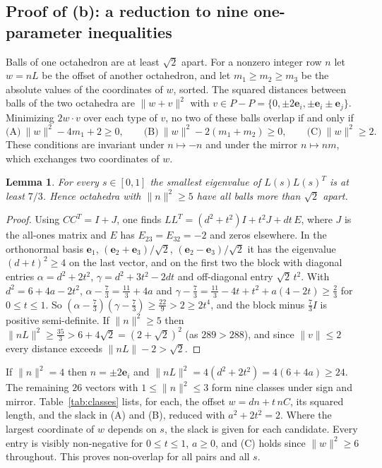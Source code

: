 \documentclass[11pt]{amsart}
\newtheorem{lemma}{Lemma}
\theoremstyle{definition}
\theoremstyle{remark}
\newcommand{\e}{\mathbf{e}}
\newcommand{\norm}[1]{\lVert#1\rVert}
\begin{document}
\subsection{Proof of (b): a reduction to nine one-parameter inequalities}
Balls of one octahedron are at least $\sqrt2$ apart. For a nonzero integer row $n$ let $w=nL$ be the offset of another octahedron, and let $m_1\ge m_2\ge m_3$ be the absolute values of the coordinates of $w$, sorted. The squared distances between balls of the two octahedra are $\norm{w+v}^2$ with $v\in P-P=\{0,\pm2\e_i,\pm\e_i\pm\e_j\}$. Minimizing $2w\cdot v$ over each type of $v$, no two of these balls overlap if and only if
\begin{equation}\label{eq:ABC}
\text{(A)}\ \norm w^2-4m_1+2\ge0,\qquad \text{(B)}\ \norm w^2-2(m_1+m_2)\ge0,\qquad \text{(C)}\ \norm w^2\ge2 .
\end{equation}
These conditions are invariant under $n\mapsto-n$ and under the mirror $n\mapsto nm$, which exchanges two coordinates of $w$.

\begin{lemma}\label{lem:far}
For every $s\in[0,1]$ the smallest eigenvalue of $L(s)L(s)^T$ is at least $7/3$. Hence octahedra with $\norm n^2\ge5$ have all balls more than $\sqrt2$ apart.
\end{lemma}

\begin{proof}
Using $CC^T=I+J$, one finds $LL^T=(d^2+t^2)I+t^2J+dt\,E$, where $J$ is the all-ones matrix and $E$ has $E_{23}=E_{32}=-2$ and zeros elsewhere. In the orthonormal basis $\e_1$, $(\e_2+\e_3)/\sqrt2$, $(\e_2-\e_3)/\sqrt2$ it has the eigenvalue $(d+t)^2\ge4$ on the last vector, and on the first two the block with diagonal entries $\alpha=d^2+2t^2$, $\gamma=d^2+3t^2-2dt$ and off-diagonal entry $\sqrt2\,t^2$. With $d^2=6+4a-2t^2$, $\alpha-\tfrac73=\tfrac{11}3+4a$ and $\gamma-\tfrac73=\tfrac{11}3-4t+t^2+a(4-2t)\ge\tfrac23$ for $0\le t\le1$. So $(\alpha-\tfrac73)(\gamma-\tfrac73)\ge\tfrac{22}9>2\ge2t^4$, and the block minus $\tfrac73 I$ is positive semi-definite. If $\norm n^2\ge5$ then $\norm{nL}^2\ge\tfrac{35}3>6+4\sqrt2=(2+\sqrt2)^2$ (as $289>288$), and since $\norm v\le2$ every distance exceeds $\norm{nL}-2>\sqrt2$.
\end{proof}

If $\norm n^2=4$ then $n=\pm2\e_i$ and $\norm{nL}^2=4(d^2+2t^2)=4(6+4a)\ge24$. The remaining $26$ vectors with $1\le\norm n^2\le3$ form nine classes under sign and mirror. Table~\ref{tab:classes} lists, for each, the offset $w=dn+t\,nC$, its squared length, and the slack in (A) and (B), reduced with $a^2+2t^2=2$. Where the largest coordinate of $w$ depends on $s$, the slack is given for each candidate. Every entry is visibly non-negative for $0\le t\le1$, $a\ge0$, and (C) holds since $\norm w^2\ge6$ throughout. This proves non-overlap for all pairs and all $s$.
\end{document}
